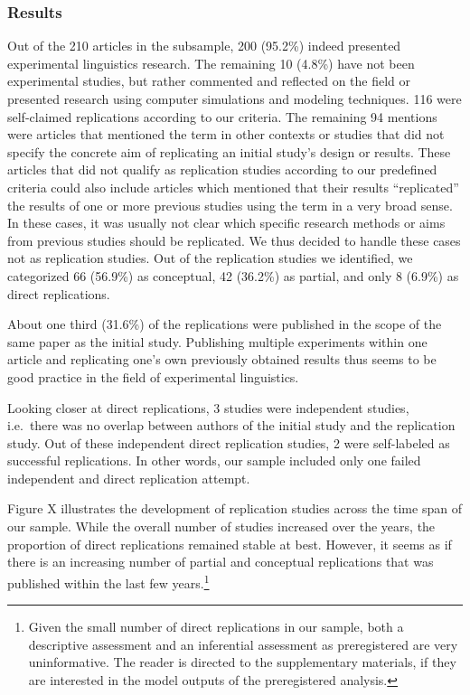 \documentclass[]{elsarticle} %
\begin{document}
\hypertarget{results-1}{%
\subsubsection{Results}\label{results-1}}

Out of the 210 articles in the subsample, 200 (95.2\%) indeed presented
experimental linguistics research. The remaining 10 (4.8\%) have not
been experimental studies, but rather commented and reflected on the
field or presented research using computer simulations and modeling
techniques. 116 were self-claimed replications according to our
criteria. The remaining 94 mentions were articles that mentioned the
term in other contexts or studies that did not specify the concrete aim
of replicating an initial study's design or results. These articles that
did not qualify as replication studies according to our predefined
criteria could also include articles which mentioned that their results
``replicated'' the results of one or more previous studies using the
term in a very broad sense. In these cases, it was usually not clear
which specific research methods or aims from previous studies should be
replicated. We thus decided to handle these cases not as replication
studies. Out of the replication studies we identified, we categorized 66
(56.9\%) as conceptual, 42 (36.2\%) as partial, and only 8 (6.9\%) as
direct replications.

About one third (31.6\%) of the replications were published in the scope
of the same paper as the initial study. Publishing multiple experiments
within one article and replicating one's own previously obtained results
thus seems to be good practice in the field of experimental linguistics.

Looking closer at direct replications, 3 studies were independent
studies, i.e.~there was no overlap between authors of the initial study
and the replication study. Out of these independent direct replication
studies, 2 were self-labeled as successful replications. In other words,
our sample included only one failed independent and direct replication
attempt.

Figure X illustrates the development of replication studies across the
time span of our sample. While the overall number of studies increased
over the years, the proportion of direct replications remained stable at
best. However, it seems as if there is an increasing number of partial
and conceptual replications that was published within the last few
years.\footnote{Given the small number of direct replications in our
  sample, both a descriptive assessment and an inferential assessment as
  preregistered are very uninformative. The reader is directed to the
  supplementary materials, if they are interested in the model outputs
  of the preregistered analysis.}
\end{document}
